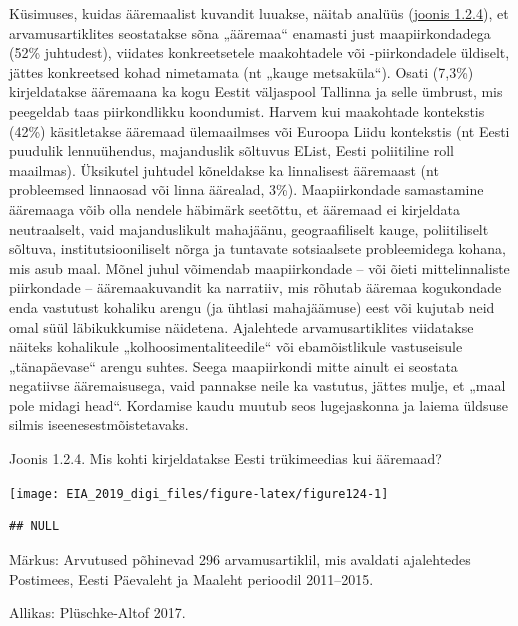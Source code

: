 \documentclass[estonian,]{article}
\begin{document}
Küsimuses, kuidas ääremaalist kuvandit luuakse, näitab analüüs (\protect\hyperlink{figure124}{joonis 1.2.4}), et arvamusartiklites seostatakse sõna „ääremaa`` enamasti just maapiirkondadega (52\% juhtudest), viidates konkreetsetele maakohtadele või -piirkondadele üldiselt, jättes konkreetsed kohad nimetamata (nt „kauge metsaküla``). Osati (7,3\%) kirjeldatakse ääremaana ka kogu Eestit väljaspool Tallinna ja selle ümbrust, mis peegeldab taas piirkondlikku koondumist. Harvem kui maakohtade kontekstis (42\%) käsitletakse ääremaad ülemaailmses või Euroopa Liidu kontekstis (nt Eesti puudulik lennuühendus, majanduslik sõltuvus EList, Eesti poliitiline roll maailmas). Üksikutel juhtudel kõneldakse ka linnalisest ääremaast (nt probleemsed linnaosad või linna äärealad, 3\%). Maapiirkondade samastamine ääremaaga võib olla nendele häbimärk seetõttu, et ääremaad ei kirjeldata neutraalselt, vaid majanduslikult mahajäänu, geograafiliselt kauge, poliitiliselt sõltuva, institutsiooniliselt nõrga ja tuntavate sotsiaalsete probleemidega kohana, mis asub maal. Mõnel juhul võimendab maapiirkondade -- või õieti mittelinnaliste piirkondade -- ääremaakuvandit ka narratiiv, mis rõhutab ääremaa kogukondade enda vastutust kohaliku arengu (ja ühtlasi mahajäämuse) eest või kujutab neid omal süül läbikukkumise näidetena. Ajalehtede arvamusartiklites viidatakse näiteks kohalikule „kolhoosimentaliteedile`` või ebamõistlikule vastuseisule „tänapäevase`` arengu suhtes. Seega maapiirkondi mitte ainult ei seostata negatiivse ääremaisusega, vaid pannakse neile ka vastutus, jättes mulje, et „maal pole midagi head``. Kordamise kaudu muutub seos lugejaskonna ja laiema üldsuse silmis iseenesestmõistetavaks.

{Joonis 1.2.4.} Mis kohti kirjeldatakse Eesti trükimeedias kui ääremaad?

\begin{center}\texttt{[image: EIA\_2019\_digi\_files/figure-latex/figure124-1]} \end{center}

\begin{verbatim}
## NULL
\end{verbatim}

\begin{figure-comment}
{Märkus:} Arvutused põhinevad 296 arvamusartiklil, mis avaldati
ajalehtedes Postimees, Eesti Päevaleht ja Maaleht perioodil 2011--2015.
\end{figure-comment}

\begin{imgsource}
{Allikas:} Plüschke-Altof 2017.
\end{imgsource}
\end{document}
